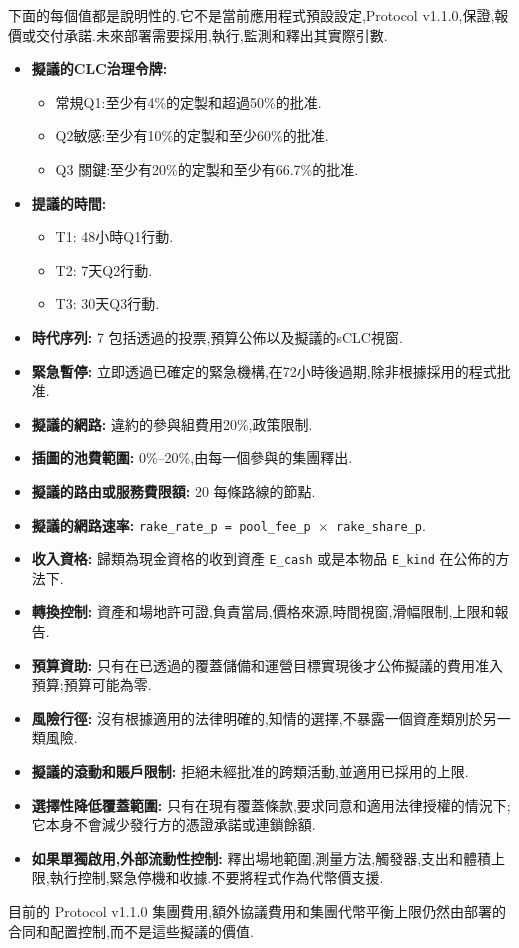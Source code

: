 \documentclass[11pt]{article}
\begin{document}
下面的每個值都是說明性的.它不是當前應用程式預設設定,Protocol v1.1.0,保證,報價或交付承諾.未來部署需要採用,執行,監測和釋出其實際引數.

\begin{itemize}[leftmargin=*]
\item \textbf{擬議的CLC治理令牌:}
\begin{itemize}[leftmargin=*]
\item 常規Q1:至少有4\%的定製和超過50\%的批准.
\item Q2敏感:至少有10\%的定製和至少60\%的批准.
\item Q3 關鍵:至少有20\%的定製和至少有66.7\%的批准.
\end{itemize}
\item \textbf{提議的時間:}
\begin{itemize}[leftmargin=*]
\item T1: 48小時Q1行動.
\item T2: 7天Q2行動.
\item T3: 30天Q3行動.
\end{itemize}
\item \textbf{時代序列:} 7 包括透過的投票,預算公佈以及擬議的sCLC視窗.
\item \textbf{緊急暫停:} 立即透過已確定的緊急機構,在72小時後過期,除非根據採用的程式批准.
\item \textbf{擬議的網路:} 違約的參與組費用20\%,政策限制.
\item \textbf{插圖的池費範圍:} 0\%--20\%,由每一個參與的集團釋出.
\item \textbf{擬議的路由或服務費限額:} 20 每條路線的節點.
\item \textbf{擬議的網路速率:} \texttt{rake\_rate\_p = pool\_fee\_p $\times$ rake\_share\_p}.
\item \textbf{收入資格:} 歸類為現金資格的收到資產 \texttt{E\_cash} 或是本物品 \texttt{E\_kind} 在公佈的方法下.
\item \textbf{轉換控制:} 資產和場地許可證,負責當局,價格來源,時間視窗,滑幅限制,上限和報告.
\item \textbf{預算資助:} 只有在已透過的覆蓋儲備和運營目標實現後才公佈擬議的費用准入預算;預算可能為零.
\item \textbf{風險行徑:} 沒有根據適用的法律明確的,知情的選擇,不暴露一個資產類別於另一類風險.
\item \textbf{擬議的滾動和賬戶限制:} 拒絕未經批准的跨類活動,並適用已採用的上限.
\item \textbf{選擇性降低覆蓋範圍:} 只有在現有覆蓋條款,要求同意和適用法律授權的情況下;它本身不會減少發行方的憑證承諾或連鎖餘額.
\item \textbf{如果單獨啟用,外部流動性控制:} 釋出場地範圍,測量方法,觸發器,支出和體積上限,執行控制,緊急停機和收據.不要將程式作為代幣價支援.
\end{itemize}
目前的 Protocol v1.1.0 集團費用,額外協議費用和集團代幣平衡上限仍然由部署的合同和配置控制,而不是這些擬議的價值.
\end{document}
